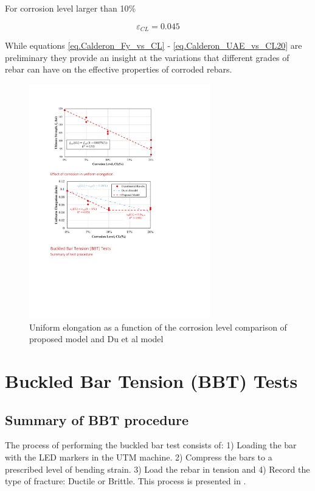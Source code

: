 For corrosion level larger than 10\%

\begin{equation}
    \varepsilon_{CL} = 0.045
    \label{eq.Calderon_UAE_vs_CL20}
\end{equation}

While equations \ref{eq.Calderon_Fy_vs_CL} - \ref{eq.Calderon_UAE_vs_CL20} are preliminary they provide an insight at the variations that different grades of rebar can have on the effective properties of corroded rebars.

\begin{figure}[htbp]
	\centering
	\includegraphics[width=0.7\textwidth]{VAC Thesis 2.0/Chapter-4/figs/TensionTest_results_4_proposedmodel.pdf}
	\caption{Uniform elongation as a function of the corrosion level comparison of proposed model and Du et al model \cite{Du2005}}
	\label{fig:UAE_vs_CL}
\end{figure}

\section{Buckled Bar Tension (BBT) Tests}
\subsection{Summary of BBT procedure}

The process of  performing the buckled bar test consists of: 1) Loading the bar with the LED markers in the UTM machine. 2) Compress the bars to a prescribed level of bending strain. 3) Load the rebar in tension and  4) Record the type of fracture: Ductile or Brittle. This process is presented in .

